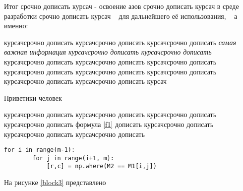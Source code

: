 \liststardot
{}
\liststart
{}
\listend
\listend

Итог срочно дописать курсач - освоение азов срочно дописать курсач в среде разработки срочно дописать курсач ~\cite{test} для дальнейшего \cite[с.~215]{2} её использования, ~\cite{2,3,4,5,6} а именно:
\liststartnum
{}
\liststart
{}
\listend
\listend

курсачсрочно дописать курсачсрочно дописать курсачсрочно дописать \emph{самая важная информация курсачсрочно дописать курсачсрочно дописать} курсачсрочно дописать курсачсрочно дописать курсачсрочно дописать курсачсрочно дописать курсачсрочно дописать курсачсрочно дописать курсачсрочно дописать курсачсрочно дописать курсач

Приветики  человек


курсачсрочно дописать курсачсрочно дописать курсачсрочно дописать курсачсрочно дописать формула \ref{f1} дописать курсачсрочно дописать курсачсрочно дописать курсачсрочно дописать

\begin{lstlisting}
for i in range(m-1):
        for j in range(i+1, m):
            [r,c] = np.where(M2 == M1[i,j])
\end{lstlisting}



На рисунке \ref{block3} представлено




